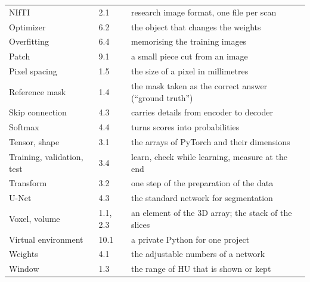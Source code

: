 \documentclass[11pt,a4paper]{article}
\begin{document}
\begin{center}
\begin{tabular}{@{}llp{9cm}@{}}
NIfTI & 2.1 & research image format, one file per scan \\
Optimizer & 6.2 & the object that changes the weights \\
Overfitting & 6.4 & memorising the training images \\
Patch & 9.1 & a small piece cut from an image \\
Pixel spacing & 1.5 & the size of a pixel in millimetres \\
Reference mask & 1.4 & the mask taken as the correct answer (``ground truth'') \\
Skip connection & 4.3 & carries details from encoder to decoder \\
Softmax & 4.4 & turns scores into probabilities \\
Tensor, shape & 3.1 & the arrays of PyTorch and their dimensions \\
Training, validation, test & 3.4 & learn, check while learning, measure at the end \\
Transform & 3.2 & one step of the preparation of the data \\
U-Net & 4.3 & the standard network for segmentation \\
Voxel, volume & 1.1, 2.3 & an element of the 3D array; the stack of the slices \\
Virtual environment & 10.1 & a private Python for one project \\
Weights & 4.1 & the adjustable numbers of a network \\
Window & 1.3 & the range of HU that is shown or kept \\
\bottomrule
\end{tabular}
\end{center}
\end{document}

